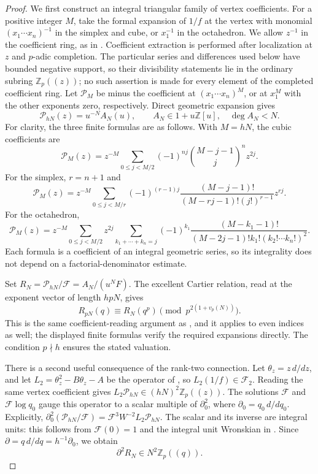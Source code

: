 \documentclass[11pt,a4paper]{article}
\theoremstyle{definition}\newtheorem{definition}[theorem]{Definition}
\theoremstyle{remark}\newtheorem{remark}[theorem]{Remark}
\numberwithin{equation}{section}
\begin{document}
\begin{proof}
We first construct an integral triangular family of vertex coefficients.
For a positive integer \(M\), take the formal expansion of \(1/f\)
at the vertex with monomial \((x_1\cdots x_n)^{-1}\) in the simplex
and cube, or \(x_1^{-1}\) in the octahedron.  We allow \(z^{-1}\)
in the coefficient ring, as in \cite[Proposition 7.17]{BV3}.
Coefficient extraction is performed after localization at \(z\) and
\(p\)-adic completion.  The particular series and differences used
below have bounded negative support, so their divisibility statements
lie in the ordinary subring \(\mathbb Z_p((z))\); no such assertion
is made for every element of the completed coefficient ring.
Let \(\mathcal P_M\) be minus the coefficient at
\((x_1\cdots x_n)^M\), or at \(x_1^M\) with the other exponents
zero, respectively.  Direct geometric expansion gives
\[
 \mathcal P_{hN}(z)=u^{-N}A_N(u),\qquad
 A_N\in1+u\mathbb Z[u],\quad\deg A_N<N.
\]
For clarity, the three finite formulas are as follows.  With \(M=hN\),
the cubic coefficients are
\[
 \mathcal P_M(z)=z^{-M}
 \sum_{0\leq j<M/2}(-1)^{nj}
         \binom{M-j-1}{j}^{n}z^{2j}.
\]
For the simplex, \(r=n+1\) and
\[
 \mathcal P_M(z)=z^{-M}
 \sum_{0\leq j<M/r}(-1)^{(r-1)j}
 \frac{(M-j-1)!}{(M-rj-1)!(j!)^{r-1}}z^{rj}.
\]
For the octahedron,
\[
 \mathcal P_M(z)=z^{-M}
 \sum_{0\leq j<M/2}z^{2j}
 \sum_{k_1+\cdots+k_n=j}
 (-1)^{k_1}
 \frac{(M-k_1-1)!}
 {(M-2j-1)!k_1!(k_2!\cdots k_n!)^2}.
\]
Each formula is a coefficient of an integral geometric series, so its
integrality does not depend on a factorial-denominator estimate.

Set \(R_N=\mathcal P_{hN}/\mathcal F=A_N/(u^NF)\).
The excellent Cartier relation, read at the exponent vector of length
\(hpN\), gives
\begin{equation}\label{T:eq:negative-triangular-frob}
 R_{pN}(q)\equiv R_N(q^p)
 \pmod{p^{2(1+v_p(N))}}.
\end{equation}
This is the same coefficient-reading argument as
\cite[Proposition 7.17]{BV3}, and it applies to even indices as well;
the displayed finite formulas verify the required expansions directly.
The condition \(p\nmid h\) ensures the stated valuation.

There is a second useful consequence of the rank-two connection.
Let \(\theta_z=z\,d/dz\), and let
\(L_2=\theta_z^2-B\theta_z-A\) be the operator of
\cite[Proposition 7.6]{BV3}, so
\(L_2(1/f)\in\mathscr F_2\).
Reading the same vertex coefficient gives
\(L_2\mathcal P_{hN}\in (hN)^2\mathbb Z_p((z))\).
The solutions \(\mathcal F\) and \(\mathcal F\log q_0\)
gauge this operator to a scalar multiple of \(\partial_0^2\),
where \(\partial_0=q_0\,d/dq_0\).
Explicitly,
\(\partial_0^2(\mathcal P_{hN}/\mathcal F)
 =\mathcal F^3W^{-2}L_2\mathcal P_{hN}\).
The scalar and its inverse are integral units: this follows from
\(\mathcal F(0)=1\) and the integral unit Wronskian in
\cite[Proposition 7.9]{BV3}.  Since
\(\partial=q\,d/dq=h^{-1}\partial_0\), we obtain
\begin{equation}\label{T:eq:negative-weighted-principal}
 \partial^2R_N\in N^2\mathbb Z_p((q)).
\end{equation}


\end{proof}
\end{document}
